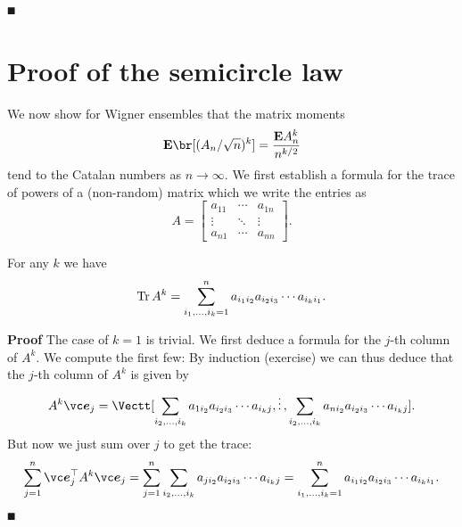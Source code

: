 \ensuremath{\QED}

\section{Proof of the semicircle law}
We now show for Wigner ensembles that the matrix moments
\[
\ensuremath{\bm{\mathrm{E}}}\br[(A_n/\sqrt{n})^k] = {\ensuremath{\bm{\mathrm{E}}}A_n^k \over n^{k/2}}
\]
tend to the Catalan numbers as $n \ensuremath{\rightarrow} \ensuremath{\infty}$. We first establish a formula for the trace of powers of a (non-random) matrix which we write the entries as
\[
A = \begin{bmatrix} a_{11} & \ensuremath{\cdots} & a_{1n} \\ \ensuremath{\vdots} & \ensuremath{\ddots} & \ensuremath{\vdots} \\ a_{n1} & \ensuremath{\cdots} & a_{nn} 
\end{bmatrix}.
\]
\begin{proposition} For any $k$ we have
\[
{\rm Tr}\, A^k = \sum_{i_1,\ldots,i_k = 1}^n a_{i_1 i_2} a_{i_2 i_3} \cdots a_{i_k i_1}.
\]
\end{proposition}
\textbf{Proof} The case of $k = 1$ is trivial. We first deduce a formula for the $j$-th column of $A^k$. We compute the first few:
By induction (exercise) we can thus deduce that the $j$-th column of $A^k$ is given by
\[
A^k \ensuremath{\bm{\e}}_j = \Vectt[\ensuremath{\sum}_{i_2,\ensuremath{\ldots},i_k} a_{1 i_2} a_{i_2 i_3} \ensuremath{\cdots} a_{i_k j}, \ensuremath{\vdots}, \ensuremath{\sum}_{i_2,\ensuremath{\ldots},i_k} a_{n i_2} a_{i_2 i_3} \ensuremath{\cdots} a_{i_k j}].
\]
But now we just sum over $j$ to get the trace:
\[
\ensuremath{\sum}_{j=1}^n \ensuremath{\bm{\e}}_j^\ensuremath{\top} A^k \ensuremath{\bm{\e}}_j = \ensuremath{\sum}_{j=1}^n \ensuremath{\sum}_{i_2,\ensuremath{\ldots},i_k} a_{j i_2} a_{i_2 i_3} \ensuremath{\cdots} a_{i_k j} = \ensuremath{\sum}_{i_1,\ensuremath{\ldots},i_k = 1}^n a_{i_1 i_2} a_{i_2 i_3} \ensuremath{\cdots} a_{i_k i_1}.
\]
\ensuremath{\QED}


